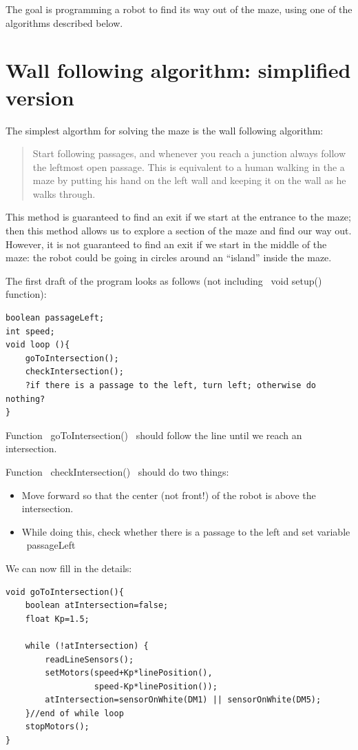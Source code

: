 \documentclass[oneside]{stml-l}
\numberwithin{figure}{chapter}
\begin{document}
The goal is  programming a robot to find its way out of the
maze, using one of the  algorithms described below.


\section{Wall  following algorithm: simplified version}
The simplest algorthm for solving the maze is the wall following algorithm:
\begin{quote}
  Start following passages, and whenever 
you reach a junction always follow the  leftmost open passage. This 
is  equivalent to a human walking in the  a maze by putting his 
hand on the left wall and keeping it on the wall as he walks through. 
\end{quote}
This method  is guaranteed to find an exit if we start at the entrance 
to the maze; then  this method allows us to explore a section 
of the maze and find our way out. However, it  is not guaranteed to 
find an exit if we start in the middle of the maze: the robot could be 
going in circles around an ``island'' inside the maze.

The first draft of the program looks as follows (not including ~void setup()~ function):
\begin{lstlisting}
boolean passageLeft;
int speed;
void loop (){ 
    goToIntersection();
    checkIntersection();
    ?if there is a passage to the left, turn left; otherwise do nothing?
}
\end{lstlisting}
Function ~goToIntersection()~ should follow the line until we reach an 
intersection. 

Function ~checkIntersection()~ should do two things: 
\begin{itemize}
\item Move forward so that the center (not front!)  of the robot is 
above the intersection. 
\item While doing this, check whether there is a passage to the left 
and set variable ~passageLeft~
\end{itemize}

We can now fill in the details:
\begin{lstlisting}
void goToIntersection(){
    boolean atIntersection=false;
    float Kp=1.5;
    
    while (!atIntersection) {
        readLineSensors();
        setMotors(speed+Kp*linePosition(), 
                  speed-Kp*linePosition());       
        atIntersection=sensorOnWhite(DM1) || sensorOnWhite(DM5); 
    }//end of while loop
    stopMotors();
}    
\end{lstlisting}
\end{document}
